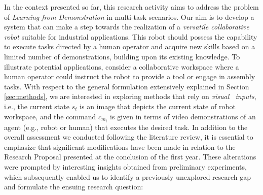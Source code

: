 In the context presented so far, this research activity aims to address the problem of \textit{Learning from Demonstration} in multi-task scenarios. Our aim is to develop a system that can make a step towards the realization of a \textit{versatile collaborative robot} suitable for industrial applications. This robot should possess the capability to execute tasks directed by a human operator and acquire new skills based on a limited number of demonstrations, building upon its existing knowledge. To illustrate potential applications, consider a collaborative workspace where a human operator could instruct the robot to provide a tool or engage in assembly tasks.
\newline With respect to the general formulation extensively explained in Section \ref{sec:methods}, we are interested in exploring methods that rely on \textit{visual \ inputs}, i.e., the current state $s_{t}$ is an image that depicts the current state of robot workspace, and the command $c_{m_{i}}$ is given in terms of video demonstrations of an agent (e.g., robot or human) that executes the desired task.
\newline In addition to the overall assessment we conducted following the literature review, it is essential to emphasize that significant modifications have been made in relation to the Research Proposal presented at the conclusion of the first year. These alterations were prompted by interesting insights obtained from preliminary experiments, which subsequently enabled us to identify a previously unexplored research gap and formulate the ensuing research question:
